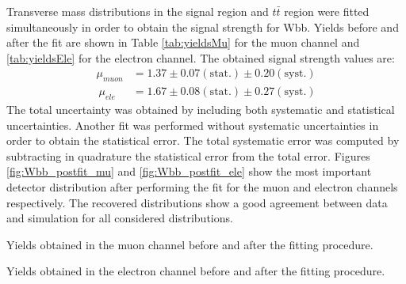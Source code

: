Transverse mass distributions in the signal region and $t\bar{t}$ region were fitted simultaneously in order to obtain the signal strength for Wbb. Yields before and after the fit are shown in Table \ref{tab:yieldsMu} for the muon channel and \ref{tab:yieldsEle} for the electron channel. The obtained signal strength values are:
\begin{align*}
\mu_{muon} &= 1.37 \pm 0.07\mathrm{(stat.)} \pm 0.20 \mathrm{(syst.)}\\\
\mu_{ele} &= 1.67 \pm 0.08\mathrm{(stat.)} \pm 0.27\mathrm{(syst.)}
\end{align*}
The total uncertainty was obtained by including both systematic and statistical uncertainties. Another fit was performed without systematic uncertainties in order to obtain the statistical error. The total systematic error was computed by subtracting in quadrature the statistical error from the total error. 
Figures \ref{fig:Wbb_postfit_mu} and \ref{fig:Wbb_postfit_ele} show the most important detector distribution after performing the fit for the muon and electron channels respectively. The recovered distributions show a good agreement between data and simulation for all considered distributions.

\begin{table}[h!]
\caption{Yields obtained in the muon channel before and after the fitting procedure.}
\label{tab:yieldsMu}

\end{table}
\begin{table}[h!]
\caption{Yields obtained in the electron channel before and after the fitting procedure.}
\label{tab:yieldsEle}

\end{table}

